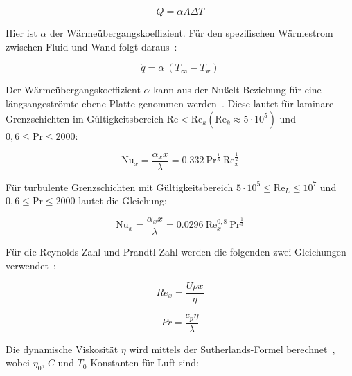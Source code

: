 \begin{equation}
    \dot{Q}=\alpha A \Delta T 
\end{equation}

Hier ist $\alpha$ der Wärmeübergangskoeffizient.
Für den spezifischen Wärmestrom zwischen Fluid und Wand folgt daraus~\cite{Weigand-2022}:

\begin{equation}
  \label{eq:qdot_freestream}
  \dot{q} = \alpha \ (T_{\infty} - T_\text{w})
\end{equation}

Der Wärmeübergangskoeffizient $\alpha$ kann aus der Nußelt-Beziehung für eine längsangeströmte ebene Platte genommen werden~\cite{Weigand-2022}. Diese lautet
für laminare Grenzschichten im Gültigkeitsbereich $\text{Re} < \text{Re}_k \left(\text{Re}_k \approx 5 \cdot 10^5\right)$ und $0,6 \leq \text{Pr} \leq 2000$:

\begin{equation}
  \label{eq:nusselt_laminar}
  \text{Nu}_x = \frac{\alpha_x x}{\lambda} = \num{0,332} \ \text{Pr}^{\frac{1}{3}} \ \text{Re}_x^{\frac{1}{2}}
\end{equation}

Für turbulente Grenzschichten mit Gültigkeitsbereich $5 \cdot 10^5 \leq \text{Re}_L \leq 10^7$ und $ 0,6 \leq \text{Pr} \leq 2000$ lautet die Gleichung:

\begin{equation}
  \label{eq:nusselt_turbulent}
  \text{Nu}_x = \frac{\alpha_x x}{\lambda} = \num{0,0296} \ \text{Re}_x^{0,8} \ \text{Pr}^{\frac{1}{3}}
\end{equation}

Für die Reynolds-Zahl und Prandtl-Zahl werden die folgenden zwei Gleichungen verwendet~\cite{Weigand-2022}:

\noindent\begin{minipage}{.5\linewidth}
  \begin{equation}
    \label{eq:reynolds}
    Re_x = \frac{U \rho x}{\eta}
  \end{equation}
\end{minipage}%
\begin{minipage}{.5\linewidth}
  \begin{equation}
    \label{eq:prandtl}
    Pr = \frac{c_p \eta}{\lambda}
  \end{equation}
\end{minipage}

Die dynamische Viskosität $\eta$ wird mittels der Sutherlands-Formel berechnet~\cite{Anderson-2017}, wobei $\eta_0$, $C$ und $T_0$ Konstanten für Luft sind:

